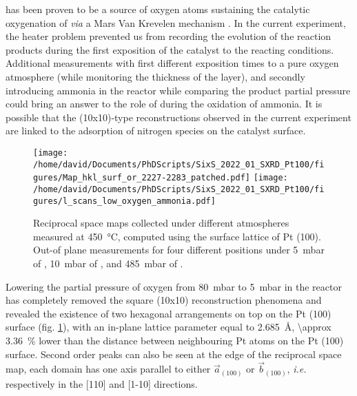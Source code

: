  has been proven to be a source of oxygen atoms sustaining the catalytic oxygenation of  \textit{via} a Mars Van Krevelen mechanism \parencite{Seriani2006, Seriani2008}.
In the current experiment, the heater problem prevented us from recording the evolution of the reaction products during the first exposition of the catalyst to the reacting conditions.
Additional measurements with first different exposition times to a pure oxygen atmosphere (while monitoring the thickness of the  layer), and secondly introducing ammonia in the reactor while comparing the product partial pressure could bring an answer to the role of  during the oxidation of ammonia.
It is possible that the (10x10)-type reconstructions observed in the current experiment are linked to the adsorption of nitrogen species on the catalyst surface.

\begin{figure}[!htb]
    \centering
    \texttt{[image: /home/david/Documents/PhDScripts/SixS\_2022\_01\_SXRD\_Pt100/figures/Map\_hkl\_surf\_or\_2227-2283\_patched.pdf]}
    \texttt{[image: /home/david/Documents/PhDScripts/SixS\_2022\_01\_SXRD\_Pt100/figures/l\_scans\_low\_oxygen\_ammonia.pdf]}
    \caption{
        Reciprocal space maps collected under different atmospheres measured at \qty{450}{\degreeCelsius}, computed using the surface lattice of Pt (100).
        Out-of plane measurements for four different positions under \qty{5}{\milli\bar} of , \qty{10}{\milli\bar} of , and \qty{485}{\milli\bar} of .
    }
    \label{fig:MapsAndLScansPt100LowOxAmmonia}
\end{figure}

Lowering the partial pressure of oxygen from \qty{80}{\milli\bar} to \qty{5}{\milli\bar} in the reactor has completely removed the square (10x10) reconstruction phenomena and revealed the existence of two hexagonal arrangements on top on the Pt (100) surface (fig. \ref{fig:MapsAndLScansPt100LowOxAmmonia}), with an in-plane lattice parameter equal to \qty{2.685}{\angstrom}, \qty{\approx 3.36}{\percent} lower than the distance between neighbouring Pt atoms on the Pt (100) surface.
Second order peaks can also be seen at the edge of the reciprocal space map, each domain has one axis parallel to either $\vec{a}_{(100)}$ or $\vec{b}_{(100)}$, \textit{i.e.} respectively in the [110] and [1-10] directions.

